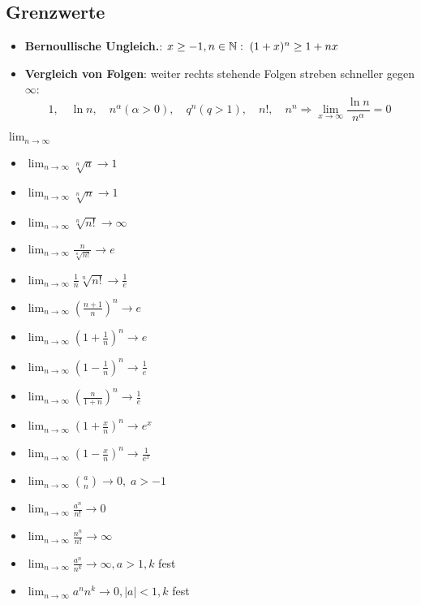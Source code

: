 \subsection{Grenzwerte}
\begin{itemize}[leftmargin=*]
	\item \textbf{Bernoullische Ungleich.}: $x \geq -1, n \in \mathbb{N}: \; (1+x)^n \geq 1+nx$
	\item \textbf{Vergleich von Folgen}: weiter rechts stehende Folgen streben
	schneller gegen $\infty$:
	\[
		1, \quad \ln n, \quad n^\alpha (\alpha > 0), \quad q^n (q > 1), \quad n!, \quad n^n \Rightarrow
		\lim_{x \to \infty} \frac{\ln n}{n^\alpha} = 0
	\]
\end{itemize}
$\lim_{n \to \infty}$
\begin{itemize}[leftmargin=*]
	\item $\lim_{n \to \infty} \sqrt[n]{a} \rightarrow 1$
	\item $\lim_{n \to \infty} \sqrt[n]{n} \rightarrow 1$
	\item $\lim_{n \to \infty} \sqrt[n]{n!} \rightarrow \infty$
	\item $\lim_{n \to \infty} \frac{n}{\sqrt[n]{n!}} \rightarrow e$
	\item $\lim_{n \to \infty} \frac{1}{n} \sqrt[n]{n!} \rightarrow \frac{1}{e}$
	\item $\lim_{n \to \infty} \left ( \frac{n+1}{n} \right )^n \rightarrow e$
	\item $\lim_{n \to \infty} \left ( 1 + \frac{1}{n} \right )^n \rightarrow e$
	\item $\lim_{n \to \infty} \left ( 1 - \frac{1}{n} \right )^n \rightarrow \frac{1}{e}$
	\item $\lim_{n \to \infty} \left ( \frac{n}{1 + n} \right )^n \rightarrow \frac{1}{e}$
	\item $\lim_{n \to \infty} \left ( 1 + \frac{x}{n} \right )^n \rightarrow e^x$
	\item $\lim_{n \to \infty} \left ( 1 - \frac{x}{n} \right )^n \rightarrow \frac{1}{e^x}$
	\item $\lim_{n \to \infty} {a \choose n} \rightarrow 0, \; a > -1$
	\item $\lim_{n \to \infty} \frac{a^n}{n!} \rightarrow 0$
	\item $\lim_{n \to \infty} \frac{n^n}{n!} \rightarrow \infty$
	\item $\lim_{n \to \infty} \frac{a^n}{n^k} \rightarrow \infty, a > 1, k$ fest
	\item $\lim_{n \to \infty} a^n n^k \rightarrow 0, |a| < 1, k$ fest

\end{itemize}
